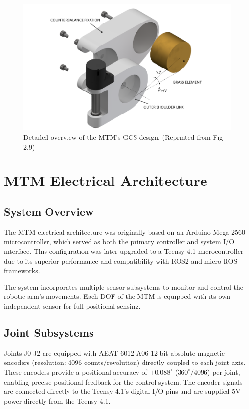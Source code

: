 \begin{figure}[H] %
    \centering
    \includegraphics[width=1.0\linewidth]{figures/GCS_detailed.png}
    \caption{Detailed overview of the MTM's GCS design. (Reprinted from \cite{walder2022design} Fig 2.9)}
    \label{fig:GCS_detailed}
\end{figure}

\section{MTM Electrical Architecture}


\subsection{System Overview}
The MTM electrical architecture was originally based on an Arduino Mega 2560 microcontroller, which served as both the primary controller and system I/O interface. This configuration was later upgraded to a Teensy 4.1 microcontroller due to its superior performance and compatibility with ROS2 and micro-ROS frameworks.

The system incorporates multiple sensor subsystems to monitor and control the robotic arm's movements. Each DOF of the MTM is equipped with its own independent sensor for full positional sensing.

\subsection{Joint Subsystems}
Joints J0-J2 are equipped with AEAT-6012-A06 12-bit absolute magnetic encoders (resolution: 4096 counts/revolution) directly coupled to each joint axis. These encoders provide a positional accuracy of $\pm 0.088^\circ$ ($360^\circ/4096$) per joint, enabling precise positional feedback for the control system. The encoder signals are connected directly to the Teensy 4.1's digital I/O pins and are supplied 5V power directly from the Teensy 4.1.

